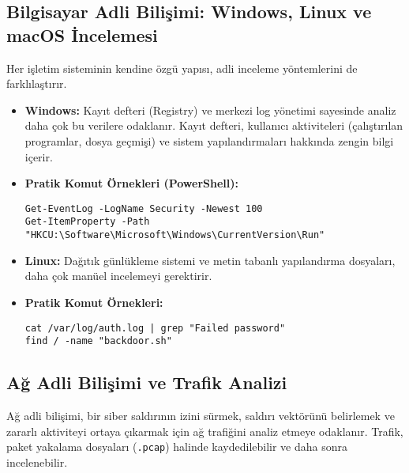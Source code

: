 \begin{itemize}
\subsection{Bilgisayar Adli Bilişimi: Windows, Linux ve macOS İncelemesi}

Her işletim sisteminin kendine özgü yapısı, adli inceleme yöntemlerini de farklılaştırır.

\begin{itemize}
    \item \textbf{Windows:} Kayıt defteri (Registry) ve merkezi log yönetimi sayesinde analiz daha çok bu verilere odaklanır. Kayıt defteri, kullanıcı aktiviteleri (çalıştırılan programlar, dosya geçmişi) ve sistem yapılandırmaları hakkında zengin bilgi içerir.
    \item \textbf{Pratik Komut Örnekleri (PowerShell):}
    \begin{verbatim}
Get-EventLog -LogName Security -Newest 100
Get-ItemProperty -Path "HKCU:\Software\Microsoft\Windows\CurrentVersion\Run"
    \end{verbatim}
    \item \textbf{Linux:} Dağıtık günlükleme sistemi ve metin tabanlı yapılandırma dosyaları, daha çok manüel incelemeyi gerektirir.
    \item \textbf{Pratik Komut Örnekleri:}
    \begin{verbatim}
cat /var/log/auth.log | grep "Failed password"
find / -name "backdoor.sh"
    \end{verbatim}
\end{itemize}

\subsection{Ağ Adli Bilişimi ve Trafik Analizi}

Ağ adli bilişimi, bir siber saldırının izini sürmek, saldırı vektörünü belirlemek ve zararlı aktiviteyi ortaya çıkarmak için ağ trafiğini analiz etmeye odaklanır. Trafik, paket yakalama dosyaları (\texttt{.pcap}) halinde kaydedilebilir ve daha sonra incelenebilir.


\end{itemize}
